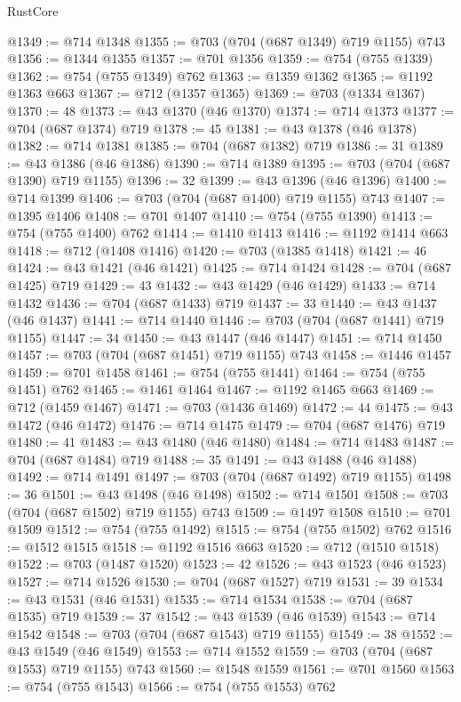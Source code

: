 \begin{lexlean}{RustCore}
\begin{coremodule}
@1349 := @714 @1348
@1355 := @703 (@704 (@687 @1349) @719 @1155) @743
@1356 := @1344 @1355
@1357 := @701 @1356
@1359 := @754 (@755 @1339)
@1362 := @754 (@755 @1349) @762
@1363 := @1359 @1362
@1365 := @1192 @1363 @663
@1367 := @712 (@1357 @1365)
@1369 := @703 (@1334 @1367)
@1370 := 48
@1373 := @43 @1370 (@46 @1370)
@1374 := @714 @1373
@1377 := @704 (@687 @1374) @719
@1378 := 45
@1381 := @43 @1378 (@46 @1378)
@1382 := @714 @1381
@1385 := @704 (@687 @1382) @719
@1386 := 31
@1389 := @43 @1386 (@46 @1386)
@1390 := @714 @1389
@1395 := @703 (@704 (@687 @1390) @719 @1155)
@1396 := 32
@1399 := @43 @1396 (@46 @1396)
@1400 := @714 @1399
@1406 := @703 (@704 (@687 @1400) @719 @1155) @743
@1407 := @1395 @1406
@1408 := @701 @1407
@1410 := @754 (@755 @1390)
@1413 := @754 (@755 @1400) @762
@1414 := @1410 @1413
@1416 := @1192 @1414 @663
@1418 := @712 (@1408 @1416)
@1420 := @703 (@1385 @1418)
@1421 := 46
@1424 := @43 @1421 (@46 @1421)
@1425 := @714 @1424
@1428 := @704 (@687 @1425) @719
@1429 := 43
@1432 := @43 @1429 (@46 @1429)
@1433 := @714 @1432
@1436 := @704 (@687 @1433) @719
@1437 := 33
@1440 := @43 @1437 (@46 @1437)
@1441 := @714 @1440
@1446 := @703 (@704 (@687 @1441) @719 @1155)
@1447 := 34
@1450 := @43 @1447 (@46 @1447)
@1451 := @714 @1450
@1457 := @703 (@704 (@687 @1451) @719 @1155) @743
@1458 := @1446 @1457
@1459 := @701 @1458
@1461 := @754 (@755 @1441)
@1464 := @754 (@755 @1451) @762
@1465 := @1461 @1464
@1467 := @1192 @1465 @663
@1469 := @712 (@1459 @1467)
@1471 := @703 (@1436 @1469)
@1472 := 44
@1475 := @43 @1472 (@46 @1472)
@1476 := @714 @1475
@1479 := @704 (@687 @1476) @719
@1480 := 41
@1483 := @43 @1480 (@46 @1480)
@1484 := @714 @1483
@1487 := @704 (@687 @1484) @719
@1488 := 35
@1491 := @43 @1488 (@46 @1488)
@1492 := @714 @1491
@1497 := @703 (@704 (@687 @1492) @719 @1155)
@1498 := 36
@1501 := @43 @1498 (@46 @1498)
@1502 := @714 @1501
@1508 := @703 (@704 (@687 @1502) @719 @1155) @743
@1509 := @1497 @1508
@1510 := @701 @1509
@1512 := @754 (@755 @1492)
@1515 := @754 (@755 @1502) @762
@1516 := @1512 @1515
@1518 := @1192 @1516 @663
@1520 := @712 (@1510 @1518)
@1522 := @703 (@1487 @1520)
@1523 := 42
@1526 := @43 @1523 (@46 @1523)
@1527 := @714 @1526
@1530 := @704 (@687 @1527) @719
@1531 := 39
@1534 := @43 @1531 (@46 @1531)
@1535 := @714 @1534
@1538 := @704 (@687 @1535) @719
@1539 := 37
@1542 := @43 @1539 (@46 @1539)
@1543 := @714 @1542
@1548 := @703 (@704 (@687 @1543) @719 @1155)
@1549 := 38
@1552 := @43 @1549 (@46 @1549)
@1553 := @714 @1552
@1559 := @703 (@704 (@687 @1553) @719 @1155) @743
@1560 := @1548 @1559
@1561 := @701 @1560
@1563 := @754 (@755 @1543)
@1566 := @754 (@755 @1553) @762

\end{coremodule}
\end{lexlean}
